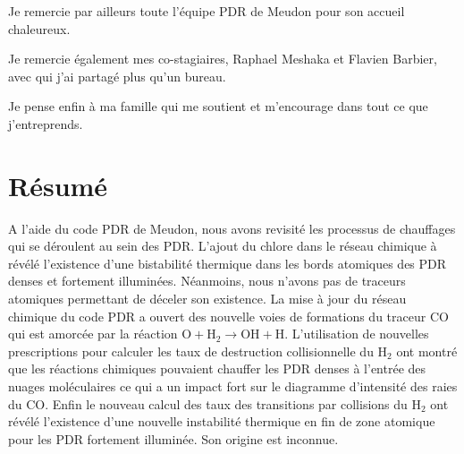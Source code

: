 \documentclass[11pt,a4paper,twoside,openright]{article}
\begin{document}
\begin{spacing}{0.98}
Je remercie par ailleurs toute l’équipe PDR de Meudon pour son accueil chaleureux.\newline

Je remercie également mes co-stagiaires, Raphael Meshaka et Flavien Barbier, avec qui j’ai partagé plus qu'un bureau.  \newline

Je pense enfin à ma famille qui me soutient et m’encourage dans tout ce que j’entreprends. 


\newpage 

\clearpage 
\thispagestyle{nofancy}
\section*{Résumé}

A l'aide du code PDR de Meudon, nous avons revisité les processus de chauffages qui se déroulent au sein des PDR. L'ajout du chlore dans le réseau chimique à révélé l'existence d'une bistabilité thermique dans les bords atomiques des PDR denses et fortement illuminées. Néanmoins, nous n'avons pas de traceurs atomiques permettant de déceler son existence. La mise à jour du réseau chimique du code PDR a ouvert des nouvelle voies de formations du traceur $\mathrm{CO}$ qui est amorcée par la réaction  $\mathrm{O} + \mathrm{H}_2 \rightarrow \mathrm{OH} + \mathrm{H}$. L'utilisation de nouvelles prescriptions pour calculer les taux de destruction collisionnelle du $\mathrm{H}_2$ ont montré que les réactions chimiques pouvaient chauffer les PDR denses à l'entrée des nuages moléculaires ce qui a un impact fort sur le diagramme d'intensité des raies du $\mathrm{CO}$. Enfin le nouveau calcul des taux des transitions par collisions du $\mathrm{H}_2$ ont révélé l'existence d'une nouvelle instabilité thermique en fin de zone atomique pour les PDR fortement illuminée. Son origine est inconnue.


\clearpage 
\setcounter{secnumdepth}{4}
\thispagestyle{nofancy}
\tableofcontents

\setcounter{figure}{0}    

\newpage




\end{spacing}
\end{document}
